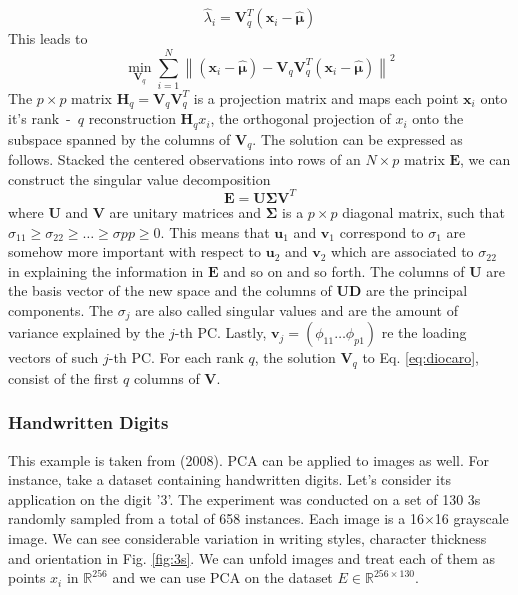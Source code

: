 \begin{equation}
    \hat{\lambda}_i = \mathbf{V}_q^{T}(\mathbf{x}_i-\hat{\bm{\mu}})
\end{equation}
This leads to 
\begin{equation}
\label{eq:diocaro}
    \min _{\mathbf{V}_q} \sum_{i=1}^N\left\|\left(\mathbf{x}_i-\hat{\bm{\mu}}\right)-\mathbf{V}_q \mathbf{V}_q^T\left(\mathbf{x}_i-\hat{\bm{\mu}}\right)\right\|^2
\end{equation}
The $p \times p$ matrix $\mathbf{H}_q=\mathbf{V}_q\mathbf{V}_q^T$ is a projection matrix and maps each point $\mathbf{x}_i$ onto it's rank~-~$q$ reconstruction $\mathbf{H}_qx_i$, the orthogonal projection of $x_i$ onto the subspace spanned by the columns of $\mathbf{V}_q$. The solution can be expressed as follows. Stacked the centered observations into rows of an $N\times p$ matrix $\mathbf{E}$, we can construct the singular value decomposition
\begin{equation}
    \label{eq:SVD}
    \mathbf{E}=\mathbf{U}\bm{\Sigma}\mathbf{V}^T
\end{equation}
where $\mathbf{U}$ and $\mathbf{V}$ are unitary matrices and $\bm{\Sigma}$ is a $p \times p$ diagonal matrix, such that $\sigma_{11}\ge \sigma_{22} \ge \dots \ge \sigma{pp}\ge 0$. This means that $\mathbf{u}_1$ and $\mathbf{v}_1$ correspond to $\sigma_1$ are somehow more important with respect to $\mathbf{u}_2$ and $\mathbf{v}_2$ which are associated to $\sigma_{22}$ in explaining the information in $\mathbf{E}$ and so on and so forth. The columns of $\mathbf{U}$ are the basis vector of the new space and the columns of $\mathbf{U}\mathbf{D}$ are the principal components. The $\sigma_{j}$ are also called singular values and are the amount of variance explained by the $j$-th PC. Lastly, $\mathbf{v}_j=(\phi_{11} \dots \phi_{p1})$ re the loading vectors of such $j$-th PC.  For each rank $q$, the solution $\mathbf{V}_q$ to Eq. \ref{eq:diocaro}, consist of the first $q$ columns of $\mathbf{V}$. 

\subsubsection{Handwritten Digits}
This example is taken from \citeauthor{tibshirani_elements_2008} (2008).
PCA can be applied to images as well. For instance, take a dataset containing handwritten digits. Let's consider its application on the digit '3'. The experiment was conducted on a set of 130 3s randomly sampled from a total of 658 instances. Each image is a 16$\times$16 grayscale image. We can see considerable variation in writing styles, character thickness and orientation in Fig. \ref{fig:3s}.  We can unfold images and treat each of them as points $x_i$ in $\mathbb{R}^{256}$ and we can use PCA on the dataset $E\in\mathbb{R}^{256\times 130}$.

